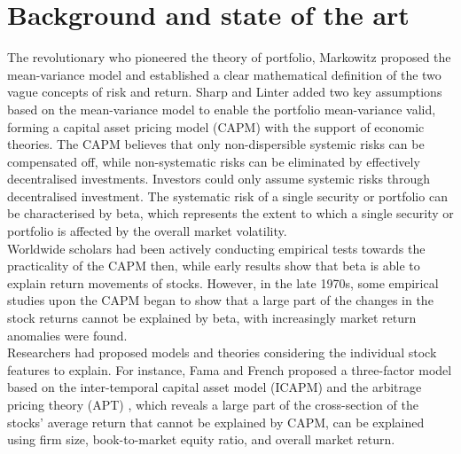 \chapter[Background]{Background and state of the art}
The revolutionary who pioneered the theory of portfolio, Markowitz \cite{portfolio} proposed the mean-variance model and established a clear mathematical definition of the two vague concepts of risk and return. Sharp \cite{equilibrium} and Linter \cite{diversification} added two key assumptions based on the mean-variance model to enable the portfolio mean-variance valid, forming a capital asset pricing model (CAPM) with the support of economic theories. The CAPM believes that only non-dispersible systemic risks can be compensated off, while non-systematic risks can be eliminated by effectively decentralised investments. Investors could only assume systemic risks through decentralised investment. The systematic risk of a single security or portfolio can be characterised by beta, which represents the extent to which a single security or portfolio is affected by the overall market volatility.\\[2mm]
Worldwide scholars had been actively conducting empirical tests towards the practicality of the CAPM then, while early results show that beta is able to explain return movements of stocks. However, in the late 1970s, some empirical studies upon the CAPM began to show that a large part of the changes in the stock returns cannot be explained by beta, with increasingly market return anomalies were found.\\[2mm]
Researchers had proposed models and theories considering the individual stock features to explain. For instance, Fama and French \cite{riskfactors, anomalies} proposed a three-factor model based on the inter-temporal capital asset model (ICAPM) \cite{intertemporal} and the arbitrage pricing theory (APT) \cite{options}, which reveals a large part of the cross-section of the stocks’ average return that cannot be explained by CAPM, can be explained using firm size, book-to-market equity ratio, and overall market return.\\[2mm]
